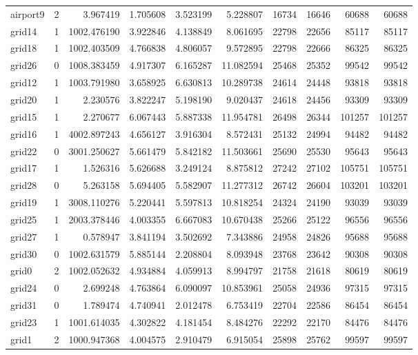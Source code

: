 \begin{longtable}{|l|r|r|r|r|r|r|r|r|r|}
airport9 & 2 & 3.967419 & 1.705608 & 3.523199 & 5.228807 & 16734 & 16646 & 60688 & 60688 \\
grid14 & 1 & 1002.476190 & 3.922846 & 4.138849 & 8.061695 & 22798 & 22656 & 85117 & 85117 \\
grid18 & 1 & 1002.403509 & 4.766838 & 4.806057 & 9.572895 & 22798 & 22666 & 86325 & 86325 \\
grid26 & 0 & 1008.383459 & 4.917307 & 6.165287 & 11.082594 & 25468 & 25352 & 99542 & 99542 \\
grid12 & 1 & 1003.791980 & 3.658925 & 6.630813 & 10.289738 & 24614 & 24448 & 93818 & 93818 \\
grid20 & 1 & 2.230576 & 3.822247 & 5.198190 & 9.020437 & 24618 & 24456 & 93309 & 93309 \\
grid15 & 1 & 2.270677 & 6.067443 & 5.887338 & 11.954781 & 26498 & 26344 & 101257 & 101257 \\
grid16 & 1 & 4002.897243 & 4.656127 & 3.916304 & 8.572431 & 25132 & 24994 & 94482 & 94482 \\
grid22 & 0 & 3001.250627 & 5.661479 & 5.842182 & 11.503661 & 25690 & 25530 & 95643 & 95643 \\
grid17 & 1 & 1.526316 & 5.626688 & 3.249124 & 8.875812 & 27242 & 27102 & 105751 & 105751 \\
grid28 & 0 & 5.263158 & 5.694405 & 5.582907 & 11.277312 & 26742 & 26604 & 103201 & 103201 \\
grid19 & 1 & 3008.110276 & 5.220441 & 5.597813 & 10.818254 & 24324 & 24190 & 93039 & 93039 \\
grid25 & 1 & 2003.378446 & 4.003355 & 6.667083 & 10.670438 & 25266 & 25122 & 96556 & 96556 \\
grid27 & 1 & 0.578947 & 3.841194 & 3.502692 & 7.343886 & 24958 & 24826 & 95688 & 95688 \\
grid30 & 0 & 1002.631579 & 5.885144 & 2.208804 & 8.093948 & 23768 & 23642 & 90308 & 90308 \\
grid0 & 2 & 1002.052632 & 4.934884 & 4.059913 & 8.994797 & 21758 & 21618 & 80619 & 80619 \\
grid24 & 0 & 2.699248 & 4.763864 & 6.090097 & 10.853961 & 25058 & 24936 & 97315 & 97315 \\
grid31 & 0 & 1.789474 & 4.740941 & 2.012478 & 6.753419 & 22704 & 22586 & 86454 & 86454 \\
grid23 & 1 & 1001.614035 & 4.302822 & 4.181454 & 8.484276 & 22292 & 22170 & 84476 & 84476 \\
grid1 & 2 & 1000.947368 & 4.004575 & 2.910479 & 6.915054 & 25898 & 25762 & 99597 & 99597 \\

\end{longtable}
